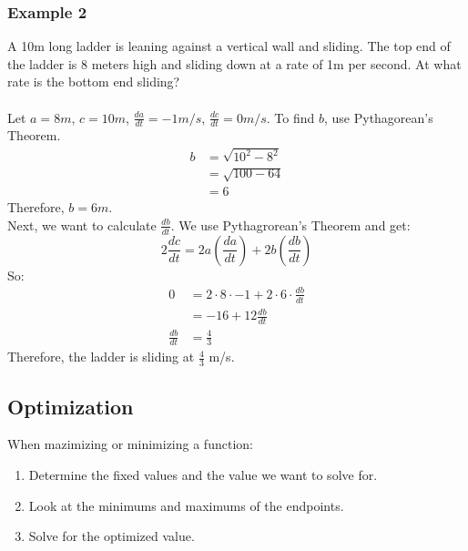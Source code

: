\documentclass{article}
\begin{document}
\subsubsection{Example 2}
A 10m long ladder is leaning against a vertical wall and sliding. The top end of the ladder is 8 meters high and sliding down at a rate of 1m per second. At what rate is the bottom end sliding?\\
\\
Let $a = 8m$, $c = 10m$, $\frac{da}{dt} = -1m/s$, $\frac{dc}{dt} = 0m/s$.
To find $b$, use Pythagorean's Theorem.
\begin{align*}
    b & = \sqrt{10^2 - 8^2}\\
    & = \sqrt{100 - 64}\\
    & = 6
\end{align*}
Therefore, $b = 6m$.\\
Next, we want to calculate $\frac{db}{dt}$. We use Pythagrorean's Theorem and get:
$$2\frac{dc}{dt} = 2 a (\frac{da}{dt}) + 2b (\frac{db}{dt})$$
So:
\begin{align*}
0 & = 2 \cdot 8 \cdot -1 + 2 \cdot 6 \cdot \frac{db}{dt}\\
& = -16 + 12 \frac{db}{dt}\\
\frac{db}{dt} & = \frac{4}{3}
\end{align*}
Therefore, the ladder is sliding at $\frac{4}{3}$ m/s.

\subsection{Optimization}
When mazimizing or minimizing a function:
\begin{enumerate}
    \item Determine the fixed values and the value we want to solve for.
    \item Look at the minimums and maximums of the endpoints.
    \item Solve for the optimized value.
\end{enumerate}
\end{document}

